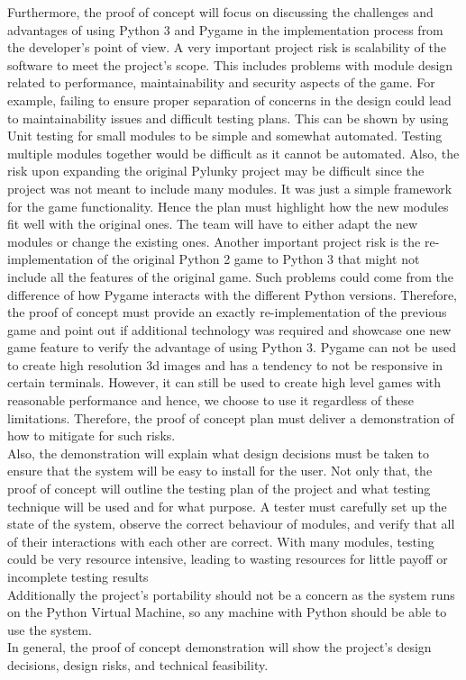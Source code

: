 \documentclass{article}
\begin{document}
Furthermore, the proof of concept will focus on discussing the challenges and advantages of using Python 3 and Pygame in the implementation process from the developer's point of view. A very important project risk is scalability of the software to meet the project's scope. This includes problems with module design related to performance, maintainability and security aspects of the game. For example, failing to ensure proper separation of concerns in the design could lead to maintainability issues and difficult testing plans. This can be shown by using Unit testing for small modules to be simple and somewhat automated. Testing multiple modules together would be difficult as it cannot be automated. Also, the risk upon expanding the original Pylunky project may be difficult since the project was not meant to include many modules. It was just a simple framework for the game functionality. Hence the plan must highlight how the new modules fit well with the original ones. The team will have to either adapt the new modules or change the existing ones. Another important project risk is the re-implementation of the original Python 2 game to Python 3 that might not include all the features of the original game. Such problems could come from the difference of how Pygame interacts with the different Python versions. Therefore, the proof of concept must provide an exactly re-implementation of the previous game and point out if additional technology was required and showcase one new game feature to verify the advantage of using Python 3. Pygame can not be used to create high resolution 3d images and has a tendency to not be responsive in certain terminals. However, it can still be used to create high level games with reasonable performance and hence, we choose to use it regardless of these limitations. Therefore, the proof of concept plan must deliver a demonstration of how to mitigate for such risks.\\
Also, the demonstration will explain what design decisions must be taken to ensure that the system will be easy to install for the user. Not only that, the proof of concept will outline the testing plan of the project and what testing technique will be used and for what purpose. A tester must carefully set up the state of the system, observe the correct behaviour of modules, and verify that all of their interactions with each other are correct. With many modules, testing could be very resource intensive, leading to wasting resources for little payoff or incomplete testing results\\
Additionally the project's portability should not be a concern as the system runs on the Python Virtual Machine, so any machine with Python should be able to use the system.\\
In general, the proof of concept demonstration will show the project's design decisions, design risks, and technical feasibility.
\end{document}
